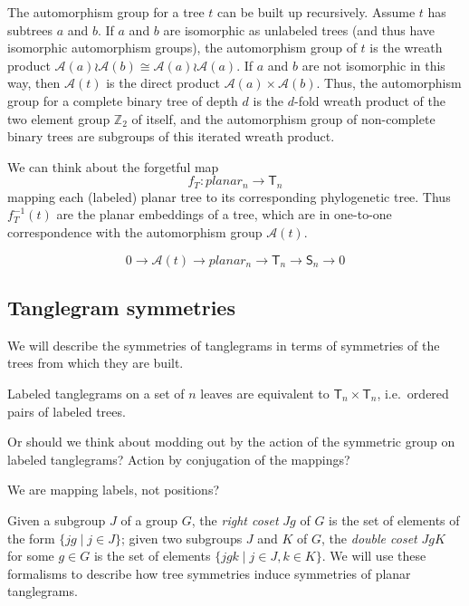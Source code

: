 \documentclass{amsart}
\newcommand{\ZZ}{\mathbb Z}
\newcommand{\aut}{\mathcal A}
\newcommand{\tree}{\mathsf{T}}
\newcommand{\shape}{\mathsf{S}}
\begin{document}
The automorphism group for a tree $t$ can be built up recursively.
Assume $t$ has subtrees $a$ and $b$.
If $a$ and $b$ are isomorphic as unlabeled trees (and thus have isomorphic automorphism groups), the automorphism group of $t$ is the wreath product $\aut(a) \wr \aut(b) \cong \aut(a) \wr \aut(a)$.
If $a$ and $b$ are not isomorphic in this way, then $\aut(t)$ is the direct product $\aut(a) \times \aut(b)$.
Thus, the automorphism group for a complete binary tree of depth $d$ is the $d$-fold wreath product of the two element group $\ZZ_2$ of itself, and the automorphism group of non-complete binary trees are subgroups of this iterated wreath product.

We can think about the forgetful map
\[
f_T: planar_n \rightarrow \tree_n
\]
mapping each (labeled) planar tree to its corresponding phylogenetic tree.
Thus $f_T^{-1}(t)$ are the planar embeddings of a tree, which are in one-to-one correspondence with the automorphism group $\aut(t)$.

\[
0 \rightarrow \aut(t) \rightarrow planar_n \rightarrow \tree_n \rightarrow \shape_n \rightarrow 0
\]



\subsection{Tanglegram symmetries}
We will describe the symmetries of tanglegrams in terms of symmetries of the trees from which they are built.

Labeled tanglegrams on a set of $n$ leaves are equivalent to $\tree_n \times \tree_n$, i.e.\ ordered pairs of labeled trees.

Or should we think about modding out by the action of the symmetric group on labeled tanglegrams?
Action by conjugation of the mappings?


We are mapping labels, not positions?


Given a subgroup $J$ of a group $G$, the \emph{right coset} $Jg$ of $G$ is the set of elements of the form $\{jg \mid j \in J\}$;
given two subgroups $J$ and $K$ of $G$, the \emph{double coset} $JgK$ for some $g \in G$ is the set of elements $\{jgk \mid j \in J, k \in K\}$.
We will use these formalisms to describe how tree symmetries induce symmetries of planar tanglegrams.
\end{document}
